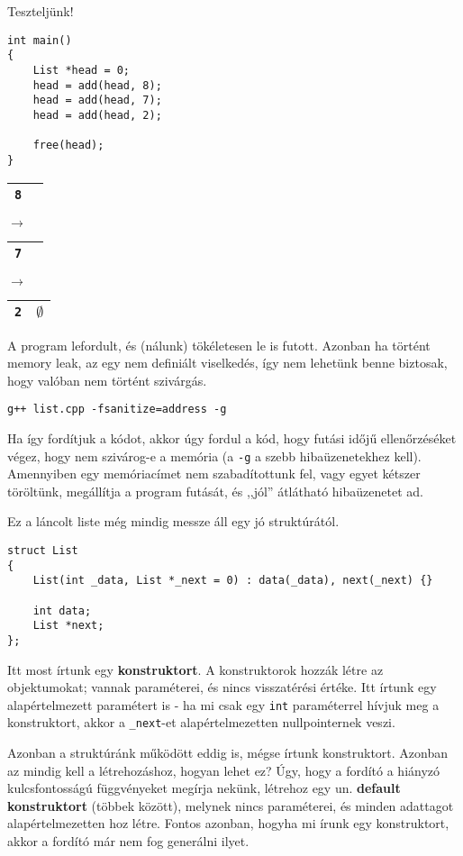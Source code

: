 \documentclass[a4paper,11.5pt]{article}
\begin{document}
	\medskip
	Teszteljünk!
	\begin{lstlisting}
int main()
{
	List *head = 0;
	head = add(head, 8);
	head = add(head, 7);
	head = add(head, 2);
	
	free(head);
}
	\end{lstlisting}
	\begin{center}
		
		\begin{tabular}{|c|c|}
			\hline
			\texttt{8}&\texttt{}\\
			\hline
		\end{tabular}$\rightarrow$
		\begin{tabular}{|c|c|}
			\hline
			\texttt{7}&\texttt{}\\
			\hline
		\end{tabular}$\rightarrow$
		\begin{tabular}{|c|c|}
			\hline
			\texttt{2}&\texttt{$\emptyset$}\\
			\hline
		\end{tabular}
	\end{center}
	A program lefordult, és (nálunk) tökéletesen le is futott. Azonban ha történt memory leak, az egy nem definiált viselkedés, így nem lehetünk benne biztosak, hogy valóban nem történt szivárgás.
	\begin{center}
		\texttt{g++ list.cpp -fsanitize=address -g}
	\end{center}
	Ha így fordítjuk a kódot, akkor úgy fordul a kód, hogy futási időjű ellenőrzéséket végez, hogy nem szivárog-e a memória (a \texttt{-g} a szebb hibaüzenetekhez kell). Amennyiben egy memóriacímet nem szabadítottunk fel, vagy egyet kétszer töröltünk, megállítja a program futását, és ,,jól'' átlátható hibaüzenetet ad.
	
	\medskip
	Ez a láncolt liste még mindig messze áll egy jó struktúrától.
	\begin{lstlisting}
struct List
{
	List(int _data, List *_next = 0) : data(_data), next(_next) {}
	
	int data;
	List *next;
};
	\end{lstlisting}
	Itt most írtunk egy \textbf{konstruktort}. A konstruktorok hozzák létre az objektumokat; vannak paraméterei, és nincs visszatérési értéke. Itt írtunk egy alapértelmezett paramétert is - ha mi csak egy \texttt{int} paraméterrel hívjuk meg a konstruktort, akkor a \texttt{\_next}-et alapértelmezetten nullpointernek veszi.
	
	\medskip
	Azonban a struktúránk működött eddig is, mégse írtunk konstruktort. Azonban az mindig kell a létrehozáshoz, hogyan lehet ez? Úgy, hogy a fordító a hiányzó kulcsfontosságú függvényeket megírja nekünk, létrehoz egy un. \textbf{default konstruktort} (többek között), melynek nincs paraméterei, és minden adattagot alapértelmezetten hoz létre. Fontos azonban, hogyha mi írunk egy konstruktort, akkor a fordító már nem fog generálni ilyet.
	
\end{document}
